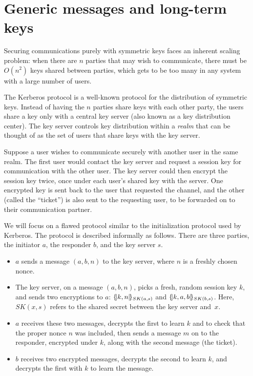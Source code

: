 \section{Generic messages and long-term keys}
\label{sec:kerberos}

Securing communications purely with symmetric keys faces an inherent
scaling problem: when there are $n$ parties that may wish to
communicate, there must be $O(n^2)$ keys shared between parties, which
gets to be too many in any system with a large number of users.

The Kerberos protocol is a well-known protocol for the distribution of
symmetric keys.  Instead of having the $n$ parties share keys with
each other party, the users share a key only with a central key server
(also known as a key distribution center).  The key server controls
key distribution within a \emph{realm} that can be thought of as the
set of users that share keys with the key server.

Suppose a user wishes to communicate securely with another user in the
same realm.  The first user would contact the key server and request a
session key for communication with the other user.  The key server
could then encrypt the session key twice, once under each user's
shared key with the server.  One encrypted key is sent back to the
user that requested the channel, and the other (called the ``ticket'')
is also sent to the requesting user, to be forwarded on to their
communication partner.

We will focus on a flawed protocol similar to the initialization
protocol used by Kerberos.  The protocol is described informally as
follows.  There are three parties, the initiator $a$, the responder
$b$, and the key server $s$.

\begin{itemize}

\item $a$ sends a message $(a, b, n)$ to the key server, where $n$ is
  a freshly chosen nonce.

\item The key server, on a message $(a, b, n)$, picks a fresh, random
  session key $k$, and sends two encryptions to $a$:
  $\{\!|k,n|\!\}_{SK(a,s)}$ and $\{\!|k,a,b|\!\}_{SK(b,s)}$.  Here, $SK(x,s)$
  refers to the shared secret between the key server and~$x$.

\item $a$ receives these two messages, decrypts the first to learn $k$
  and to check that the proper nonce $n$ was included, then sends a
  message $m$ on to the responder, encrypted under $k$, along with the
  second message (the ticket).

\item $b$ receives two encrypted messages, decrypts the second to
  learn $k$, and decrypts the first with $k$ to learn the message.
\end{itemize}

